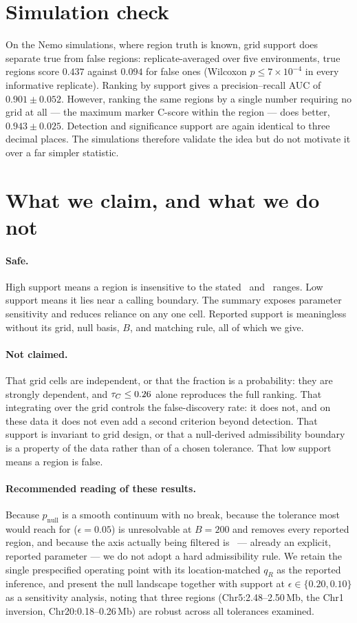 \section{Simulation check}

On the Nemo simulations, where region truth is known, grid support does separate true
from false regions: replicate-averaged over five environments, true regions score
$0.437$ against $0.094$ for false ones (Wilcoxon $p\le7\times10^{-4}$ in every
informative replicate). Ranking by support gives a precision--recall AUC of
$0.901\pm0.052$. However, ranking the same regions by a single number requiring no
grid at all --- the maximum marker C-score within the region --- does better,
$0.943\pm0.025$. Detection and significance support are again identical to three
decimal places. The simulations therefore validate the idea but do not motivate it
over a far simpler statistic.

\section{What we claim, and what we do not}

\paragraph{Safe.} High support means a region is insensitive to the stated \tauc\ and
\lmin\ ranges. Low support means it lies near a calling boundary. The summary exposes
parameter sensitivity and reduces reliance on any one cell. Reported support is
meaningless without its grid, null basis, $B$, and matching rule, all of which we
give.

\paragraph{Not claimed.} That grid cells are independent, or that the fraction is a
probability: they are strongly dependent, and $\tau_C\le0.26$ alone reproduces the full
ranking. That integrating over the grid controls the false-discovery rate: it does
not, and on these data it does not even add a second criterion beyond detection. That
support is invariant to grid design, or that a null-derived admissibility boundary is
a property of the data rather than of a chosen tolerance. That low support means a
region is false.

\paragraph{Recommended reading of these results.} Because $p_{\text{null}}$ is a smooth
continuum with no break, because the tolerance most would reach for
($\epsilon=0.05$) is unresolvable at $B=200$ and removes every reported region, and
because the axis actually being filtered is \lmin\ --- already an explicit, reported
parameter --- we do not adopt a hard admissibility rule. We retain the single
prespecified operating point with its location-matched $q_R$ as the reported
inference, and present the null landscape together with support at
$\epsilon\in\{0.20,0.10\}$ as a sensitivity analysis, noting that three regions
(Chr5:2.48--2.50\,Mb, the Chr1 inversion, Chr20:0.18--0.26\,Mb) are robust across all
tolerances examined.


